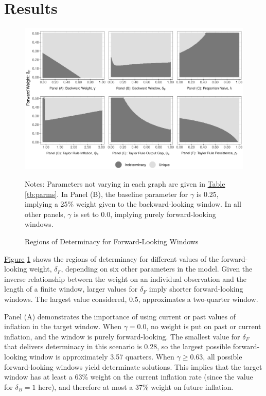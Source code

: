 \documentclass[english,authoryear,12pt]{elsarticle}
\begin{document}
\section{\label{Results}Results}

\begin{figure}
	\captionsetup{justification=centering}
	\begin{center}
		\includegraphics[width=\textwidth]{./determinacy_notitle.png}
		\vspace*{3pc}\hspace*{2pc}\parbox{0.9\textwidth}{\small{
			Notes: Parameters not varying in each graph are given in \href{tb:parms}{Table} \ref{tb:parms}. In Panel (B), the baseline parameter for $\gamma$ is 0.25, implying a 25\% weight given to the backward-looking window. In all other panels, $\gamma$ is set to 0.0, implying purely forward-looking windows.}
		}
	\end{center}
	\vspace*{-4pc}\caption{Regions of Determinacy for Forward-Looking Windows}\label{fg:determinacy}
\end{figure}

\href{fg:determinacy}{Figure} \ref{fg:determinacy} shows the regions of determinacy for different values of the forward-looking weight, $\delta_F$, depending on six other parameters in the model. Given the inverse relationship between the weight on an individual observation and the length of a finite window, larger values for $\delta_F$ imply shorter forward-looking windows. The largest value considered, 0.5, approximates a two-quarter window.

Panel (A) demonstrates the importance of using current or past values of inflation in the target window. When $\gamma=0.0$, no weight is put on past or current inflation, and the window is purely forward-looking. The smallest value for $\delta_F$ that delivers determinacy in this scenario is 0.28, so the largest possible forward-looking window is approximately 3.57 quarters. When $\gamma \geq 0.63$, all possible forward-looking windows yield determinate solutions. This implies that the target window has at least a 63\% weight on the current inflation rate (since the value for $\delta_B=1$ here), and therefore at most a 37\% weight on future inflation.
\end{document}
